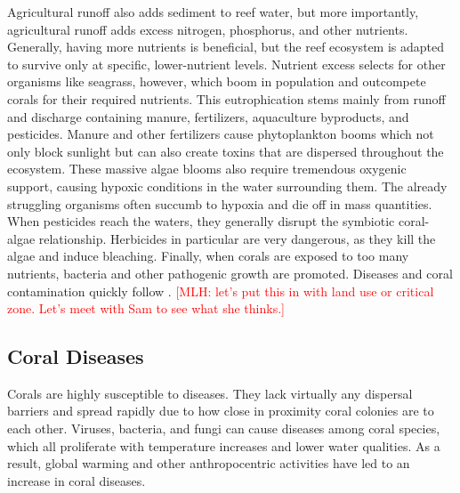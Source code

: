 \documentclass{book}\usepackage{knitr}
\newcommand{\red}[1]{\textcolor{red}{[MLH: #1]}}
\begin{document}
\begin{knitrout}
\begin{kframe}
{	Agricultural runoff also adds sediment to reef water, but more importantly, agricultural runoff adds excess nitrogen, phosphorus, and other nutrients. Generally, having more nutrients is beneficial, but the reef ecosystem is adapted to survive only at specific, lower-nutrient levels. Nutrient excess selects for other organisms like seagrass, however, which boom in population and outcompete corals for their required nutrients. This eutrophication stems mainly from runoff and discharge containing manure, fertilizers, aquaculture byproducts, and pesticides. Manure and other fertilizers cause phytoplankton booms which not only block sunlight but can also create toxins that are dispersed throughout the ecosystem. These massive algae blooms also require tremendous oxygenic support, causing hypoxic conditions in the water surrounding them. The already struggling organisms often succumb to hypoxia and die off in mass quantities. When pesticides reach the waters, they generally disrupt the symbiotic coral-algae relationship. Herbicides in particular are very dangerous, as they kill the algae and induce bleaching. Finally, when corals are exposed to too many nutrients, bacteria and other pathogenic growth are promoted. Diseases and coral contamination quickly follow \citep{4884777420100401}.
	\red{let's put this in with land use or critical zone. Let's meet with Sam to see what she thinks.}

\subsection{Coral Diseases}\label{sub:cd}

Corals are highly susceptible to diseases. They lack virtually any dispersal barriers and spread rapidly due to how close in proximity coral colonies are to each other. Viruses, bacteria, and fungi can cause diseases among coral species, which all proliferate with temperature increases and lower water qualities. As a result, global warming and other anthropocentric activities have led to an increase in coral diseases\citep{Keller2009ClimateCC}. 

}
\end{kframe}
\end{knitrout}
\end{document}
